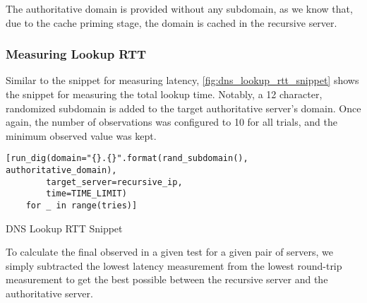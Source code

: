 The authoritative domain is provided without any subdomain, as we know that, due to the cache priming stage, the domain is cached in the recursive server.

\subsubsection{Measuring Lookup RTT}

Similar to the snippet for measuring latency, \cref{fig:dns_lookup_rtt_snippet} shows the snippet for measuring the total lookup time. Notably, a 12 character, randomized subdomain is added to the target authoritative server's domain. Once again, the number of observations was configured to 10 for all trials, and the minimum observed value was kept.

\begin{code}[h]
\centering
    \begin{verbatim}
[run_dig(domain="{}.{}".format(rand_subdomain(), authoritative_domain),
        target_server=recursive_ip, 
        time=TIME_LIMIT) 
    for _ in range(tries)]
    \end{verbatim}
    \caption{DNS Lookup RTT Snippet}
    \label{fig:dns_lookup_rtt_snippet}
\end{code}

To calculate the final \rtt observed in a given test for a given pair of servers, we simply subtracted the lowest latency measurement from the lowest round-trip measurement to get the best possible \rtt between the recursive \dns server and the authoritative \dns server.